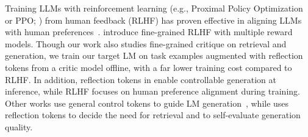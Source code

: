 

Training LLMs with reinforcement learning (e.g., Proximal Policy Optimization or PPO; \citealt{schulman2017proximal}) from human feedback (RLHF) has proven effective in aligning LLMs with human preferences~\citep{ouyang2022training}. 
\citet{wu2023fine} introduce fine-grained RLHF with multiple reward models. 
Though our work also studies fine-grained critique on retrieval and generation, we train our target LM on task examples augmented with reflection tokens from a critic 
model offline, with a far lower training cost compared to RLHF. In addition, reflection tokens in \model enable controllable generation at inference, while RLHF focuses on human preference alignment during training.
Other works use general control tokens to guide LM generation~\citep{lu2022quark,korbak2023pretraining}, while \model uses reflection tokens to decide the need for retrieval and to self-evaluate generation quality.
